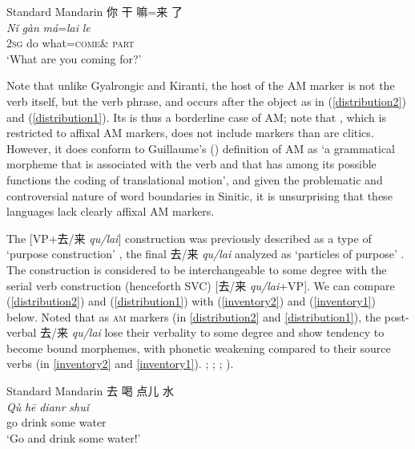 \documentclass[oneside,a4paper,11pt]{article}
\newcommand{\ipa}[1]{{\phon\textit{#1}}}
\newcommand{\zh}[1]{{\cn #1}}
\newcommand{\sens}[1]{‘#1’}
\begin{document}
\begin{exe}
\ex Standard Mandarin \citep{lamarre17motion.cum} \label{distribution1}
\glll
\zh{你} \zh{干} \zh{嘛}=\zh{来} \zh{了} \\
\ipa{Nǐ} \ipa{gàn} \ipa{má}=\ipa{lai} \ipa{le} \\
\textsc{2sg} do what=\textsc{come}$\&$ \textsc{part} \\
\glt \sens{What are you coming for?}
\end{exe}

Note that unlike Gyalrongic and Kiranti, the host of the AM marker is not the verb itself, but the verb phrase, and occurs after the object as in (\ref{distribution2}) and (\ref{distribution1}). Its is thus a borderline case of AM; note that \citet{guillaume16am}, which is restricted to affixal AM markers, does not include markers than are  clitics. However, it does conform to Guillaume's (\citeyear[13]{guillaume16am}) definition of AM as `a grammatical morpheme that is associated with the verb and that has among its possible functions the coding of translational motion', and given the problematic and controversial nature of word boundaries in Sinitic, it is unsurprising that these languages lack clearly affixal AM markers.

The [VP+\zh{去/来} \ipa{qu/lai}] construction was previously described as a type of \sens{purpose construction} \citetext{\citealp{lu1985vpqu}; \citealp{yang2012mudi}}, the final \zh{去/来} \ipa{qu/lai} analyzed as `particles of purpose' \citep[479]{chao68chinese}. The construction is considered to be interchangeable to some degree with the serial verb construction (henceforth SVC) [\zh{去/来} \ipa{qu/lai}+VP]. We can compare (\ref{distribution2}) and (\ref{distribution1}) with (\ref{inventory2}) and (\ref{inventory1}) below. Noted that as \textsc{am} markers (in \ref{distribution2} and \ref{distribution1}), the post-verbal \zh{去/来} \ipa{qu/lai} lose their verbality to some degree and show tendency to become bound morphemes, with phonetic weakening compared to their source verbs (in \ref{inventory2} and \ref{inventory1}). \citealp[479]{chao68chinese}; \citealp{lu1985vpqu}; \cite{lamarre17motion.cum} ; \cite{lamarre17deictic}).

\begin{exe}
\ex Standard Mandarin \citep{lamarre17deictic} \label{inventory2}
\glll
\zh{去} \zh{喝} \zh{点儿} \zh{水} \\
\ipa{Qù} \ipa{hē} \ipa{dianr} \ipa{shuǐ} \\
go drink some water \\
\glt \sens{Go and drink some water!}
\end{exe}
\end{document}
